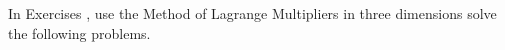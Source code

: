 {\noindent In Exercises} 
{,  use the Method of Lagrange Multipliers in three dimensions solve the following problems.
}
